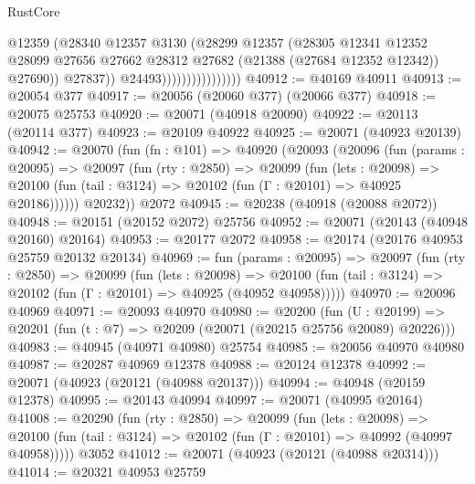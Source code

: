 \begin{lexlean}{RustCore}
\begin{coremodule}
                                      @12359
                                      (@28340
                                        @12357
                                        @3130
                                        (@28299
                                          @12357
                                          (@28305
                                            @12341
                                            @12352
                                            @28099
                                            @27656
                                            @27662
                                            @28312
                                            @27682
                                            (@21388 (@27684 @12352 @12342))
                                            @27690))
                                        @27837))
                                    @24493))))))))))))))))
@40912 := @40169 @40911
@40913 := @20054 @377
@40917 := @20056 (@20060 @377) (@20066 @377)
@40918 := @20075 @25753
@40920 := @20071 (@40918 @20090)
@40922 := @20113 (@20114 @377)
@40923 := @20109 @40922
@40925 := @20071 (@40923 @20139)
@40942 := @20070
    (fun (fn : @101) =>
    @40920
      (@20093
        (@20096
          (fun (params : @20095) =>
          @20097
            (fun (rty : @2850) =>
            @20099
              (fun (lets : @20098) =>
              @20100 (fun (tail : @3124) => @20102 (fun (Γ : @20101) => @40925 @20186))))))
        @20232))
    @2072
@40945 := @20238 (@40918 (@20088 @2072))
@40948 := @20151 (@20152 @2072) @25756
@40952 := @20071 (@20143 (@40948 @20160) @20164)
@40953 := @20177 @2072
@40958 := @20174 (@20176 @40953 @25759 @20132 @20134)
@40969 := fun (params : @20095) =>
  @20097
    (fun (rty : @2850) =>
    @20099
      (fun (lets : @20098) =>
      @20100 (fun (tail : @3124) => @20102 (fun (Γ : @20101) => @40925 (@40952 @40958)))))
@40970 := @20096 @40969
@40971 := @20093 @40970
@40980 := @20200
    (fun (U : @20199) => @20201 (fun (t : @7) => @20209 (@20071 (@20215 @25756 @20089) @20226)))
@40983 := @40945 (@40971 @40980) @25754
@40985 := @20056 @40970 @40980
@40987 := @20287 @40969 @12378
@40988 := @20124 @12378
@40992 := @20071 (@40923 (@20121 (@40988 @20137)))
@40994 := @40948 (@20159 @12378)
@40995 := @20143 @40994
@40997 := @20071 (@40995 @20164)
@41008 := @20290
    (fun (rty : @2850) =>
    @20099
      (fun (lets : @20098) =>
      @20100 (fun (tail : @3124) => @20102 (fun (Γ : @20101) => @40992 (@40997 @40958)))))
    @3052
@41012 := @20071 (@40923 (@20121 (@40988 @20314)))
@41014 := @20321 @40953 @25759

\end{coremodule}
\end{lexlean}
